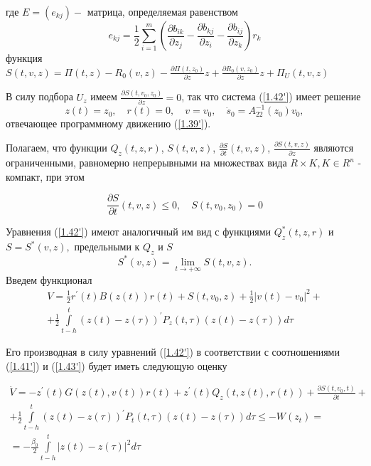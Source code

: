 где $E = (e_{kj}) - $ матрица, определяемая равенством 
$$e_{kj} = \frac12 \sum_{ i = 1}^{m} (\frac{\partial b_{ik}}{\partial z_j} - \frac{\partial b_{kj}}{\partial z_i} - \frac{\partial b_{ij}}{\partial z_k}) r_k$$
функция $S(t, v, z) = \Pi (t, z) - R_0 (v, z) - \frac{\partial \Pi (t, z_0)}{\partial z} z + \frac{\partial R_0 (v, z_0)}{\partial z} z + \Pi_U (t, v, z)$

В силу подбора $U_z$ имеем $\frac{\partial S(t, v_0, z_0)}{\partial z} = 0$, так что система (\ref{1.42'}) имеет решение 
$$z(t) = z_0, \quad r(t) = 0, \quad v = v_0, \quad \dot s_0 = A_{22}^{-1} (z_0) v_0,$$ 
отвечающее программному движению (\ref{1.39'}).

Полагаем, что функции $Q_z (t, z, r)$, $S(t, v, z)$, $\frac{\partial S}{\partial t} (t, v, z)$, $\frac{\partial S(t, v, z)}{\partial z}$ являются ограниченными, равномерно непрерывными на множествах вида $R \times K, K \in R^n$ - компакт, при этом

\begin{equation} \label{1.43'}
\frac{\partial S}{\partial t} (t, v, z) \le 0, \quad S(t, v_0, z_0) = 0
\end{equation}

Уравнения (\ref{1.42'}) имеют аналогичный им вид с функциями $Q_z^{*} (t, z, r)$ и $S = S^{*} (v, z),$ предельными к $Q_z$ и $S$
$$S^{*} (v, z) = \lim_{t \to + \infty} S(t, v, z).$$
Введем функционал
$$
\begin{array}{c}
\displaystyle V = \frac12 r^{'}(t) B (z(t)) r(t) + S(t, v_0, z) + \frac12 \left| v(t) - v_0 \right|^2 +\\
\displaystyle + \frac12 \int\limits_{t - h}^{t} (z(t) - z(\tau))^{'} P_z (t, \tau) (z(t) - z(\tau)) d \tau
\end{array}
$$

Его производная в силу уравнений (\ref{1.42'}) в соответствии с соотношениями (\ref{1.41'}) и (\ref{1.43'}) будет иметь следующую оценку

\begin{equation} \label{1.44'}
\begin{array}{c}
\displaystyle \dot V = - z^{'} (t) G(z(t), v(t)) r(t) + z^{'} (t) Q_z (t, z(t), r(t)) + \frac{\partial S(t, v_0, t)}{\partial t} +\\
\displaystyle + \frac12 \displaystyle\int\limits_{t - h}^{t} (z(t) - z(\tau))^{'} P_t(t, \tau) (z(t) - z(\tau)) d \tau \le - W(z_t) =\\
\displaystyle = -\frac{\beta_0}{2} \displaystyle\int\limits_{t - h}^{t} \left| z(t) - z(\tau) \right|^2 d \tau
\end{array}
\end{equation}


